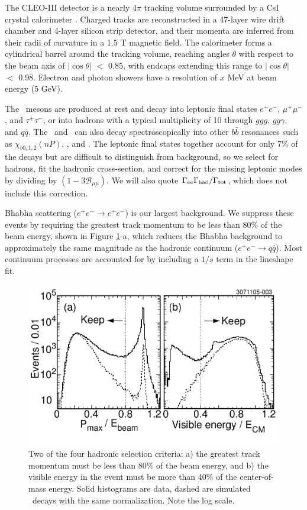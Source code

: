 \documentclass[aps,prl,twocolumn,superscriptaddress,showpacs]{revtex4}
\begin{document}
The CLEO-III detector is a nearly 4$\pi$ tracking volume surrounded by
a CsI crystal calorimeter \cite{cleoiii}.  Charged tracks are
reconstructed in a 47-layer wire drift chamber and 4-layer silicon
strip detector, and their momenta are inferred from their radii of
curvature in a 1.5 T magnetic field.  The calorimeter forms a
cylindrical barrel around the tracking volume, reaching angles
$\theta$ with respect to the beam axis of $|\cos\theta|$ $<$ 0.85,
with endcaps extending this range to $|\cos\theta|$ $<$ 0.98.
Electron and photon showers have a resolution of $x$ MeV at beam
energy (5 GeV).

The \ups\ mesons are produced at rest and decay into leptonic final
states $e^+e^-$, $\mu^+\mu^-$, and $\tau^+\tau^-$, or into hadrons
with a typical multiplicity of 10 through $ggg$, $gg\gamma$, and
$q\bar{q}$.  The \uss\ and \usss\ can also decay spectroscopically
into other $b\bar{b}$ resonances such as $\chi_{b0,1,2}(nP)$, \us, and
\uss.  The leptonic final states together account for only 7\% of the
decays but are difficult to distinguish from background, so we select
for hadrons, fit the hadronic cross-section, and correct for the
missing leptonic modes by dividing by $(1 - 3{\mathcal B}_{\mu\mu})$.
We will also quote $\Gamma_{ee}\Gamma_{\mbox{\scriptsize had}}/\Gamma_{\mbox{\scriptsize tot}}$, which does not include this
correction.

Bhabha scattering ($e^+e^- \to e^+e^-$) is our largest background.  We
suppress these events by requiring the greatest track momentum to be
less than 80\% of the beam energy, shown in Figure \ref{fig:cuts}-a,
which reduces the Bhabha background to approximately the same
magnitude as the hadronic continuum ($e^+e^- \to q\bar{q}$).  Most
continuum processes are accounted for by including a $1/s$ term in the
lineshape fit.

\begin{figure}
  \includegraphics[width=\linewidth]{cuts}
  \caption{\label{fig:cuts} Two of the four hadronic selection
  criteria: a) the greatest track momentum must be less than 80\% of
  the beam energy, and b) the visible energy in the event must be more
  than 40\% of the center-of-mass energy.  Solid histograms are data,
  dashed are simulated \ups\ decays with the same normalization.  Note
  the log scale.}
\end{figure}
\end{document}
